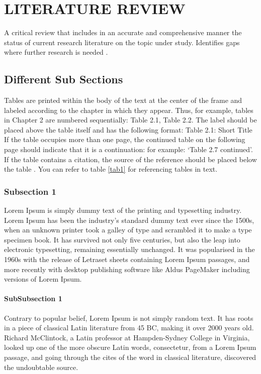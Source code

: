 \chapter{LITERATURE REVIEW}\thispagestyle{EmptyHeader}
\label{chp:2}
A critical review that includes in an accurate and comprehensive manner the status of current research literature on the topic under study. Identifies gaps where further research is needed \citep{lowry1951protein}.  

\section{Different Sub Sections}

Tables are printed within the body of the text at the center of the frame and labeled according to the chapter in which they appear. Thus, for example, tables in Chapter 2 are numbered sequentially: Table 2.1, Table 2.2.
The label should be placed above the table itself and has the following format:
Table 2.1: Short Title
If the table occupies more than one page, the continued table on the following page should indicate that it is a continuation: for example: ‘Table 2.7 continued’. If the table contains a citation, the source of the reference should be placed below the table \citep{weber1969reliability}. You can refer to  table \ref{tab1} for referencing tables in text.

\subsection{Subsection 1}
Lorem Ipsum is simply dummy text of the printing and typesetting industry. Lorem Ipsum has been the industry's standard dummy text ever since the 1500s, when an unknown printer took a galley of type and scrambled it to make a type specimen book. It has survived not only five centuries, but also the leap into electronic typesetting, remaining essentially unchanged. It was popularised in the 1960s with the release of Letraset sheets containing Lorem Ipsum passages, and more recently with desktop publishing software like Aldus PageMaker including versions of Lorem Ipsum.
\subsubsection{SubSubsection 1}
Contrary to popular belief, Lorem Ipsum is not simply random text. It has roots in a piece of classical Latin literature from 45 BC, making it over 2000 years old. Richard McClintock, a Latin professor at Hampden-Sydney College in Virginia, looked up one of the more obscure Latin words, consectetur, from a Lorem Ipsum passage, and going through the cites of the word in classical literature, discovered the undoubtable source.
